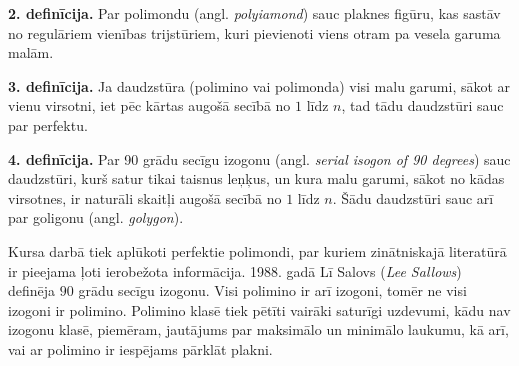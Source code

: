 \documentclass[utf8]{ludis2022}
\begin{document}
\noindent
{\bf{2. definīcija.}} Par polimondu (angl. {\em polyiamond}) sauc plaknes figūru, kas sastāv no regulāriem vienības trijstūriem, 
kuri pievienoti viens otram pa vesela garuma malām.

\vspace{10pt}

\noindent
{\bf{3. definīcija.}} Ja daudzstūra (polimino vai polimonda) visi malu garumi, sākot ar vienu virsotni, iet 
pēc kārtas augošā secībā no $1$ līdz $n$, tad tādu daudzstūri sauc par perfektu.

\vspace{10pt}
\noindent
{\bf{4. definīcija.}} Par 90 grādu secīgu
izogonu (angl. {\em serial isogon of 90 degrees}) sauc daudzstūri, kurš satur tikai taisnus leņķus, un kura malu garumi, sākot no kādas virsotnes, ir naturāli skaitļi augošā secībā no $1$ līdz $n$. Šādu daudzstūri sauc arī par goligonu (angl. {\em golygon}).

\newpage
{}

\firstparskip Kursa darbā tiek aplūkoti perfektie polimondi, par kuriem zinātniskajā literatūrā ir pieejama ļoti ierobežota informācija. 1988. gadā Lī Salovs ({\em Lee Sallows}) definēja $90$ grādu secīgu izogonu. Visi polimino ir arī izogoni, tomēr ne visi izogoni ir polimino. Polimino klasē tiek pētīti vairāki saturīgi uzdevumi, kādu nav izogonu klasē, piemēram, jautājums par maksimālo un minimālo laukumu, kā arī, vai ar polimino ir iespējams pārklāt plakni. 
\end{document}
